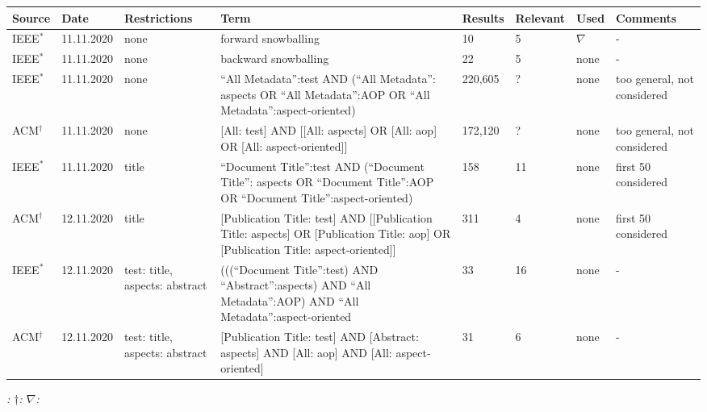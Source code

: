 \newpage
{}
\begin{landscape}
\begin{small}
\begin{table}
\caption{Literature Research Documentation.}
\begin{longtable}{p{1.3cm}|p{1.8cm}|>{\raggedright}p{2.3cm}|>{\raggedright}p{6cm}|p{1.5cm}|p{1.5cm}|p{1.2cm}|p{2cm}}

\hline
\textbf{Source} & \textbf{Date} & \textbf{Restrictions} & \textbf{Term} & \textbf{Results} & \textbf{Relevant} & \textbf{Used} & \textbf{Comments}\\
\hline
IEEE$^*$ & 11.11.2020 & none & forward snowballing & 10 & 5 & $\nabla$ & -\\
\hline
IEEE$^*$ & 11.11.2020 & none & backward snowballing & 22 & 5 & none & -\\
\hline
IEEE$^*$ & 11.11.2020 & none & \enquote{All Metadata}:test AND (\enquote{All Metadata}: aspects OR \enquote{All Metadata}:AOP OR \enquote{All Metadata}:aspect-oriented) & 220,605 & ? & none & too general, not considered\\
\hline
ACM$^\dagger$ & 11.11.2020 & none & [All: test] AND [[All: aspects] OR [All: aop] OR [All: aspect-oriented]] & 172,120 & ? & none & too general, not considered\\
\hline
IEEE$^*$ & 11.11.2020 & title &\enquote{Document Title}:test AND (\enquote{Document Title}: aspects OR \enquote{Document Title}:AOP OR \enquote{Document Title}:aspect-oriented) & 158 & 11 & none & first 50 considered\\
\hline
ACM$^\dagger$ & 12.11.2020 & title &[Publication Title: test] AND [[Publication Title: aspects] OR [Publication Title: aop] OR [Publication Title: aspect-oriented]] & 311 & 4 & none & first 50 considered\\
\hline
IEEE$^*$ & 12.11.2020 & test: title, aspects: abstract &(((\enquote{Document Title}:test) AND \enquote{Abstract}:aspects) AND \enquote{All Metadata}:AOP) AND \enquote{All Metadata}:aspect-oriented & 33 & 16 & none & -\\
\hline
ACM$^\dagger$ & 12.11.2020 & test: title, aspects: abstract &[Publication Title: test] AND [Abstract: aspects] AND [All: aop] AND [All: aspect-oriented] & 31 & 6 & none & -\\
\hline
\end{longtable}
\textit{\qquad \qquad \qquad \qquad \qquad *: \cite{ieee} \quad $\dagger$: \cite{acm} \quad $\nabla$: \cite{Duclos}}
\label{doc}
\end{table}
\end{small}
\end{landscape}
\restoregeometry

